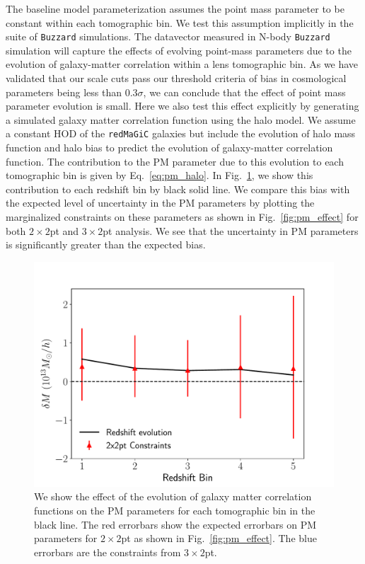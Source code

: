 \documentclass[aps, prd,twocolumn,superscriptaddress,nofootinbib,preprintnumbers]{revtex4-1}
\newcommand{\redmagic}{\texttt{redMaGiC} }
\newcommand{\buzzard}{\texttt{Buzzard} }
\begin{document}
The baseline model parameterization assumes the point mass parameter to be constant within each tomographic bin. We test this assumption implicitly in the suite of \buzzard simulations. The datavector measured in N-body \buzzard simulation will capture the effects of evolving point-mass parameters due to the evolution of galaxy-matter correlation within a lens tomographic bin. As we have validated that our scale cuts pass our threshold criteria of bias in cosmological parameters being less than 0.3$\sigma$, we can conclude that the effect of point mass parameter evolution is small. Here we also test this effect explicitly by generating a simulated galaxy matter correlation function using the halo model. We assume a constant HOD of the \redmagic galaxies but include the evolution of halo mass function and halo bias to predict the evolution of galaxy-matter correlation function. The contribution to the PM parameter due to this evolution to each tomographic bin is given by Eq.~\ref{eq:pm_halo}. In Fig.~\ref{fig:pm_evolve}, we show this contribution to each redshift bin by black solid line. We compare this bias with the expected level of uncertainty in the PM parameters by plotting the marginalized constraints on these parameters as shown in Fig.~\ref{fig:pm_effect} for both $2\times2$pt and $3\times2$pt analysis. We see that the uncertainty in PM parameters is significantly greater than the expected bias. 


\begin{figure}
\includegraphics[width=\columnwidth]{figs/PM_evolve_impact.pdf}
\caption[]{We show the effect of the evolution of galaxy matter correlation functions on the PM parameters for each tomographic bin in the black line. The red errorbars show the expected errorbars on PM parameters for $2\times2$pt as shown in Fig.~\ref{fig:pm_effect}. The blue errorbars are the constraints from $3\times2$pt.
}
\label{fig:pm_evolve}
\end{figure}
\end{document}
